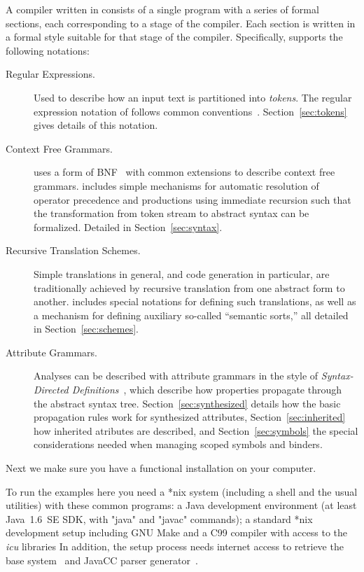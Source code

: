 \documentclass[11pt]{article} %
\begin{document}
A compiler written in \HAX consists of a single program with a series of formal sections, each
corresponding to a stage of the compiler.  Each section is written in a formal style suitable for
that stage of the compiler. Specifically, \HAX supports the following notations:
\begin{description}

\item[Regular Expressions.] Used to describe how an input text is partitioned into
  \emph{tokens}. The regular expression notation of \HAX follows common
  conventions~\cite{Aho+:2006}. Section~\ref{sec:tokens} gives details of this notation.

\item[Context Free Grammars.] \HAX uses a form of BNF~\cite{NaurEtal:cacm1960} with common
  extensions to describe context free grammars. \HAX includes simple mechanisms for automatic
  resolution of operator precedence and productions using immediate recursion such that the
  transformation from token stream to abstract syntax can be formalized.  Detailed in
  Section~\ref{sec:syntax}.

\item[Recursive Translation Schemes.] Simple translations in general, and code generation in
  particular, are traditionally achieved by recursive translation from one abstract form to another.
  \HAX includes special notations for defining such translations, as well as a mechanism for
  defining auxiliary so-called ``semantic sorts,'' all detailed in Section~\ref{sec:schemes}.

\item[Attribute Grammars.] Analyses can be described with attribute grammars in the style of
  \emph{Syntax-Directed Definitions}~\cite{Aho+:2006}, which describe how properties propagate
  through the abstract syntax tree.  Section~\ref{sec:synthesized} details how the basic propagation
  rules work for synthesized attributes, Section~\ref{sec:inherited} how inherited atributes are
  described, and Section~\ref{sec:symbols} the special considerations needed when managing scoped
  symbols and binders.

\end{description}

Next we make sure you have a functional \HAX installation on your computer.

\begin{requirements}
  To run the \HAX examples here you need a *nix system (including a shell and the usual utilities)
  with these common programs: a Java development environment (at least Java~1.6~SE SDK, with "java"
  and "javac" commands); a standard *nix development setup including GNU Make and a C99 compiler
  with access to the \emph{icu} libraries In addition, the setup process needs internet access to
  retrieve the \CRSX base system~\cite{crsx} and JavaCC parser generator~\cite{javacc}.
\end{requirements}
\end{document}
